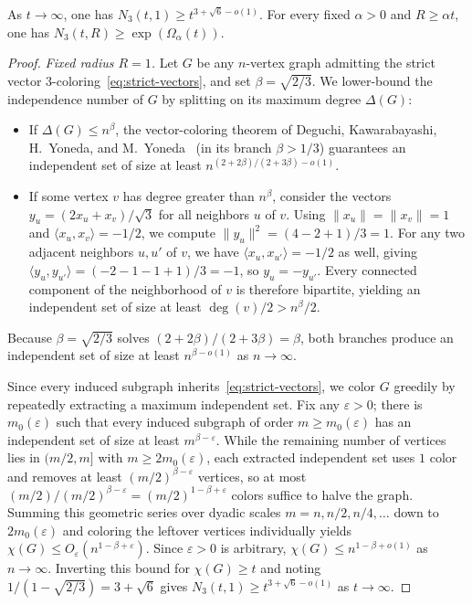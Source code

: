 \begin{proposition}\label{prop:unrestricted-order}
As $t\to\infty$, one has $N_3(t,1)\ge t^{3+\sqrt6-o(1)}$. For every fixed $\alpha>0$ and $R\ge\alpha t$, one has $N_3(t,R)\ge\exp(\Omega_\alpha(t))$.
\end{proposition}
\begin{proof}
\emph{Fixed radius $R=1$.} Let $G$ be any $n$-vertex graph admitting the strict vector $3$-coloring~\eqref{eq:strict-vectors}, and set $\beta=\sqrt{2/3}$. We lower-bound the independence number of $G$ by splitting on its maximum degree $\Delta(G)$:
\begin{itemize}
\item If $\Delta(G)\le n^\beta$, the vector-coloring theorem of Deguchi, Kawarabayashi, H.~Yoneda, and M.~Yoneda~\cite[Theorem~2]{DKYY} (in its branch $\beta>1/3$) guarantees an independent set of size at least $n^{(2+2\beta)/(2+3\beta)-o(1)}$.
\item If some vertex $v$ has degree greater than $n^\beta$, consider the vectors $y_u=(2x_u+x_v)/\sqrt3$ for all neighbors $u$ of $v$. Using $\|x_u\|=\|x_v\|=1$ and $\langle x_u,x_v\rangle=-1/2$, we compute $\|y_u\|^2=(4-2+1)/3=1$. For any two adjacent neighbors $u,u'$ of $v$, we have $\langle x_u,x_{u'}\rangle=-1/2$ as well, giving $\langle y_u,y_{u'}\rangle=(-2-1-1+1)/3=-1$, so $y_u=-y_{u'}$. Every connected component of the neighborhood of $v$ is therefore bipartite, yielding an independent set of size at least $\deg(v)/2>n^\beta/2$.
\end{itemize}
Because $\beta=\sqrt{2/3}$ solves $(2+2\beta)/(2+3\beta)=\beta$, both branches produce an independent set of size at least $n^{\beta-o(1)}$ as $n\to\infty$.

Since every induced subgraph inherits~\eqref{eq:strict-vectors}, we color $G$ greedily by repeatedly extracting a maximum independent set. Fix any $\varepsilon>0$; there is $m_0(\varepsilon)$ such that every induced subgraph of order $m\ge m_0(\varepsilon)$ has an independent set of size at least $m^{\beta-\varepsilon}$. While the remaining number of vertices lies in $(m/2,m]$ with $m\ge 2m_0(\varepsilon)$, each extracted independent set uses $1$ color and removes at least $(m/2)^{\beta-\varepsilon}$ vertices, so at most $(m/2)/(m/2)^{\beta-\varepsilon}=(m/2)^{1-\beta+\varepsilon}$ colors suffice to halve the graph. Summing this geometric series over dyadic scales $m=n,n/2,n/4,\ldots$ down to $2m_0(\varepsilon)$ and coloring the leftover vertices individually yields $\chi(G)\le O_\varepsilon(n^{1-\beta+\varepsilon})$. Since $\varepsilon>0$ is arbitrary, $\chi(G)\le n^{1-\beta+o(1)}$ as $n\to\infty$. Inverting this bound for $\chi(G)\ge t$ and noting $1/(1-\sqrt{2/3})=3+\sqrt6$ gives $N_3(t,1)\ge t^{3+\sqrt6-o(1)}$ as $t\to\infty$.


\end{proof}
